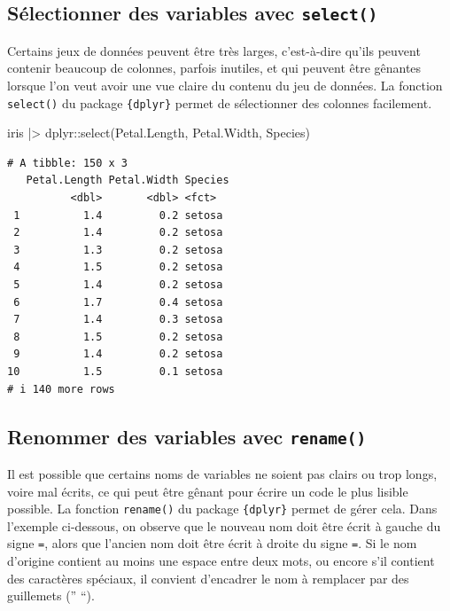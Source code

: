 \documentclass[
  letterpaper,
]{book}
\newenvironment{Shaded}{\begin{snugshade}}{\end{snugshade}}
\newcommand{\FunctionTok}[1]{\textcolor[rgb]{0.28,0.35,0.67}{#1}}
\newcommand{\NormalTok}[1]{\textcolor[rgb]{0.00,0.23,0.31}{#1}}
\newcommand{\SpecialCharTok}[1]{\textcolor[rgb]{0.37,0.37,0.37}{#1}}
\begin{document}
\subsection{\texorpdfstring{Sélectionner des variables avec
\texttt{select()}}{Sélectionner des variables avec select()}}\label{suxe9lectionner-des-variables-avec-select}

Certains jeux de données peuvent être très larges, c'est-à-dire qu'ils
peuvent contenir beaucoup de colonnes, parfois inutiles, et qui peuvent
être gênantes lorsque l'on veut avoir une vue claire du contenu du jeu
de données. La fonction \texttt{select()} du package \texttt{\{dplyr\}}
permet de sélectionner des colonnes facilement.

\begin{Shaded}
\begin{Highlighting}[]
\NormalTok{iris }\SpecialCharTok{|\textgreater{}} 
\NormalTok{  dplyr}\SpecialCharTok{::}\FunctionTok{select}\NormalTok{(Petal.Length, Petal.Width, Species)}
\end{Highlighting}
\end{Shaded}

\begin{verbatim}
# A tibble: 150 x 3
   Petal.Length Petal.Width Species
          <dbl>       <dbl> <fct>  
 1          1.4         0.2 setosa 
 2          1.4         0.2 setosa 
 3          1.3         0.2 setosa 
 4          1.5         0.2 setosa 
 5          1.4         0.2 setosa 
 6          1.7         0.4 setosa 
 7          1.4         0.3 setosa 
 8          1.5         0.2 setosa 
 9          1.4         0.2 setosa 
10          1.5         0.1 setosa 
# i 140 more rows
\end{verbatim}

\subsection{\texorpdfstring{Renommer des variables avec
\texttt{rename()}}{Renommer des variables avec rename()}}\label{renommer-des-variables-avec-rename}

Il est possible que certains noms de variables ne soient pas clairs ou
trop longs, voire mal écrits, ce qui peut être gênant pour écrire un
code le plus lisible possible. La fonction \texttt{rename()} du package
\texttt{\{dplyr\}} permet de gérer cela. Dans l'exemple ci-dessous, on
observe que le nouveau nom doit être écrit à gauche du signe \texttt{=},
alors que l'ancien nom doit être écrit à droite du signe \texttt{=}. Si
le nom d'origine contient au moins une espace entre deux mots, ou encore
s'il contient des caractères spéciaux, il convient d'encadrer le nom à
remplacer par des guillemets ('' ``).
\end{document}
